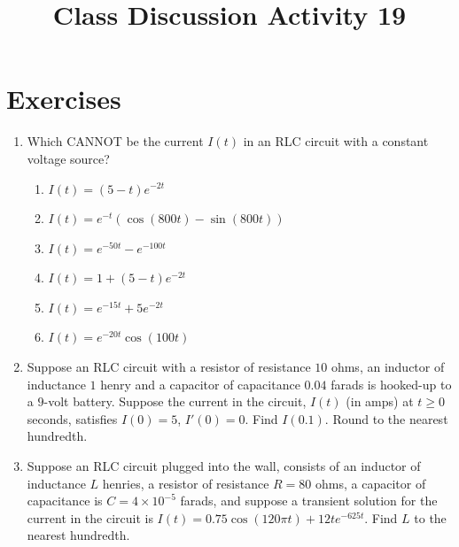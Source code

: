 \documentclass{ximera}
\begin{document}
\begin{abstract}
 \end{abstract}

    \title{Class Discussion Activity 19}
    
    \maketitle

\section*{Exercises}

\begin{enumerate}[label=(\arabic*)]


\item Which CANNOT be the current $I(t)$ in an RLC circuit with a constant voltage source?


\begin{enumerate}[label=(\alph*)]
\item $I(t)=(5-t)e^{-2t}$
\item $I(t)=e^{-t}\left(\cos{(800t)}-\sin{(800t)}\right)$
\item $I(t)=e^{-50t}-e^{-100t}$
\item $I(t)=1+(5-t)e^{-2t}$ %
\item $I(t)=e^{-15t}+5e^{-2t}$
\item $I(t)=e^{-20t}\cos{(100t)}$
\end{enumerate}


\item  Suppose an RLC circuit with a resistor of resistance $10$ ohms, an inductor of inductance $1$ henry and a capacitor of capacitance $0.04$ farads is hooked-up to a $9$-volt battery.  Suppose the current in the circuit, $I(t)$ (in amps) at $t\geq 0$ seconds, satisfies $I(0)=5$, $I'(0)=0$. Find $I(0.1)$.   Round to the nearest hundredth.



\item  Suppose an RLC circuit plugged into the wall, consists of an inductor of inductance $L$ henries, a resistor of resistance $R=80$ ohms, a capacitor of capacitance is $C=4\times 10^{-5}$ farads, and suppose a transient solution for the current in the circuit is $I(t)=0.75 \cos{(120\pi t)}+12te^{-625t}$.  Find $L$ to the nearest hundredth.



\end{enumerate}
\end{document}
